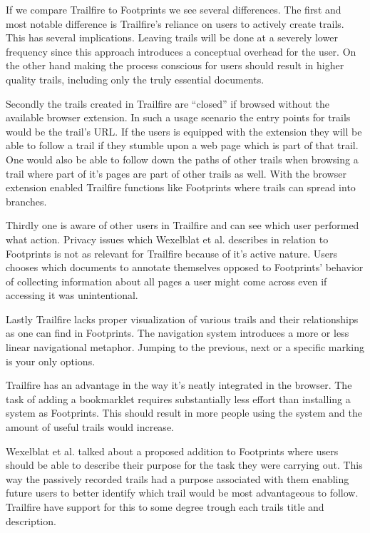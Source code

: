 \documentclass[12pt,a4paper]{article}
\begin{document}
If we compare Trailfire to Footprints we see several differences. The first
and most notable difference is Trailfire's reliance on users to actively
create trails. This has several implications. Leaving trails will be done at a
severely lower frequency since this approach introduces a conceptual overhead
for the user. On the other hand making the process conscious for users should
result in higher quality trails, including only the truly essential documents.

Secondly the trails created in Trailfire are ``closed'' if browsed without the
available browser extension. In such a usage scenario the entry points for
trails would be the trail's URL. If the users is equipped with the extension
they will be able to follow a trail if they stumble upon a web page which is
part of that trail. One would also be able to follow down the paths of other
trails when browsing a trail where part of it's pages are part of other trails
as well. With the browser extension enabled Trailfire functions like
Footprints where trails can spread into branches.

Thirdly one is aware of other users in Trailfire and can see which user
performed what action. Privacy issues which Wexelblat et al. describes in
relation to Footprints is not as relevant for Trailfire because of it's active
nature. Users chooses which documents to annotate themselves opposed to
Footprints' behavior of collecting information about all pages a user
might come across even if accessing it was unintentional.

Lastly Trailfire lacks proper visualization of various trails and their
relationships as one can find in Footprints. The navigation system introduces
a more or less linear navigational metaphor. Jumping to the previous, next or
a specific marking is your only options.

Trailfire has an advantage in the way it's neatly integrated in the browser.
The task of adding a bookmarklet requires substantially less effort than
installing a system as Footprints. This should result in more people using the
system and the amount of useful trails would increase.

Wexelblat et al. talked about a proposed addition to Footprints where users
should be able to describe their purpose for the task they were carrying out.
This way the passively recorded trails had a purpose associated with them
enabling future users to better identify which trail would be most
advantageous to follow. Trailfire have support for this to some degree trough
each trails title and description.
\end{document}
